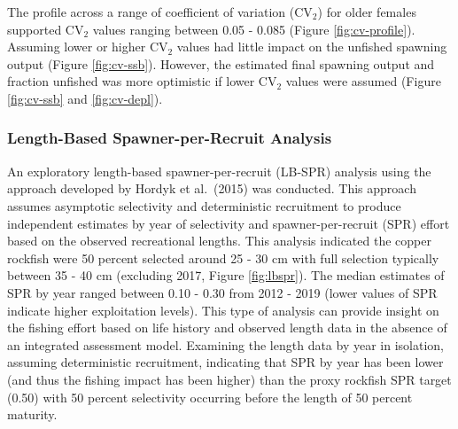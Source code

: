 \documentclass[11pt,
  english,
  a4paper,
]{article}
\begin{document}

The profile across a range of coefficient of variation ({\(\text{CV}_2\)\leavevmode\tagmcend\tagstructend}) for older females supported {\(\text{CV}_2\)\leavevmode\tagmcend\tagstructend} values ranging between 0.05 - 0.085 (Figure \ref{fig:cv-profile}). Assuming lower or higher {\(\text{CV}_2\)\leavevmode\tagmcend\tagstructend} values had little impact on the unfished spawning output (Figure \ref{fig:cv-ssb}). However, the estimated final spawning output and fraction unfished was more optimistic if lower {\(\text{CV}_2\)\leavevmode\tagmcend\tagstructend} values were assumed (Figure \ref{fig:cv-ssb} and \ref{fig:cv-depl}).

\leavevmode\tagmcend\tagstructend\par


\hypertarget{length-based-spawner-per-recruit-analysis}{%
\subsubsection{Length-Based Spawner-per-Recruit Analysis}\label{length-based-spawner-per-recruit-analysis}}

\leavevmode\tagmcend\tagstructend


An exploratory length-based spawner-per-recruit (LB-SPR) analysis using the approach developed by Hordyk et al.~{(2015)\leavevmode\tagmcend\tagstructend} was conducted. This approach assumes asymptotic selectivity and deterministic recruitment to produce independent estimates by year of selectivity and spawner-per-recruit (SPR) effort based on the observed recreational lengths. This analysis indicated the copper rockfish were 50 percent selected around 25 - 30 cm with full selection typically between 35 - 40 cm (excluding 2017, Figure \ref{fig:lbspr}). The median estimates of SPR by year ranged between 0.10 - 0.30 from 2012 - 2019 (lower values of SPR indicate higher exploitation levels). This type of analysis can provide insight on the fishing effort based on life history and observed length data in the absence of an integrated assessment model. Examining the length data by year in isolation, assuming deterministic recruitment, indicating that SPR by year has been lower (and thus the fishing impact has been higher) than the proxy rockfish SPR target (0.50) with 50 percent selectivity occurring before the length of 50 percent maturity.
\end{document}
